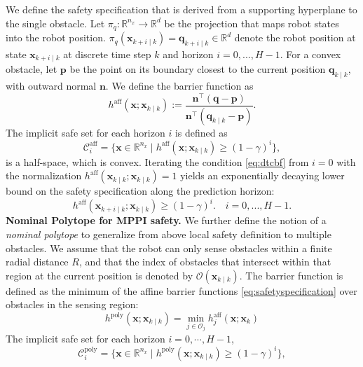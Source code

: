 \documentclass[letterpaper, 10 pt, conference]{ieeeconf}
\newcommand{\piq}{\pi_q}
\newcommand{\p}{\mathbf{p}}
\newcommand{\q}{\mathbf{q}}
\newcommand{\qk}{\mathbf{\q}_{k\mid k}}
\newcommand{\qki}{\mathbf{\q}_{k+i\mid k}}
\newcommand{\x}{\mathbf{x}}
\newcommand{\xk}{\mathbf{\x}_{k\mid k}}
\newcommand{\xki}{\mathbf{\x}_{k+i\mid k}}
\begin{document}
We define the safety specification that is derived from a supporting hyperplane to the single obstacle. Let \(\piq:\mathbb R^{n_x} \to \mathbb R^d\) be the projection that maps robot states into the robot position. \(\piq(\xki)=\qki\in\mathbb R^d\) denote the robot position at state \(\mathbf{x}_{k+i \mid k}\) at discrete time step $k$ and horizon $i = 0, ..., H-1$. For a convex obstacle, let $\mathbf{p}$ be the point on its boundary closest to the current position $\qk$, with outward normal $\mathbf{n}$. We define the barrier function as
\begin{equation}
h^{\mathrm{aff}}(\x;\xk) :=
\frac{\mathbf{n}^\top(\q-\p)}{\mathbf{n}^\top(\mathbf{q}_{k\mid k}-\mathbf{p})}.
\label{eq:aff_barrier}
\end{equation}
The implicit safe set for each horizon $i$ is defined as
\begin{equation}
\mathcal{C}^{\mathrm{aff}}_i=\{\mathbf{x} \in \mathbb{R}^{n_x} \mid h^{\mathrm{aff}}(\x;\xk)\ge (1-\gamma)^i\},\label{eq:aff_safeset}
\end{equation}
is a half-space, which is convex. Iterating the condition \eqref{eq:dtcbf} from $i=0$ with the normalization $h^{\mathrm{aff}}(\xk;\xk)=1$ yields an exponentially decaying lower bound on the safety specification along the prediction horizon:
\begin{equation}
h^{\mathrm{aff}}(\xki;\xk) \ge (1-\gamma)^i. \quad i = 0, ..., H-1.
\label{eq:safetyspecification}
\end{equation}
\noindent \textbf{Nominal Polytope for MPPI safety.} We further define the notion of a \textit{nominal polytope} to generalize from above local safety definition to multiple obstacles. 
We assume that the robot can only sense obstacles within a finite radial distance $R$, and that the index of obstacles that intersect within that region at the current position is denoted by $\mathcal{O}(\xk)$. The barrier function is defined as the minimum of the affine barrier functions \eqref{eq:safetyspecification} over obstacles in the sensing region:
\begin{equation}
    h^{\text{poly}}(\x;\xk) = \min_{j\in\mathcal{O}_j} h^{\mathrm{aff}}_j(\x;\x_k)
\end{equation}
The implicit safe set for each horizon $i=0,\cdots,H-1$,
\begin{equation}
\mathcal{C}^{\text{poly}}_i=\{\mathbf{x} \in \mathbb{R}^{n_x} \mid h^{\text{poly}}(\x;\xk)\ge (1-\gamma)^i\},\label{eq:poly_safeset}
\end{equation}
\end{document}
